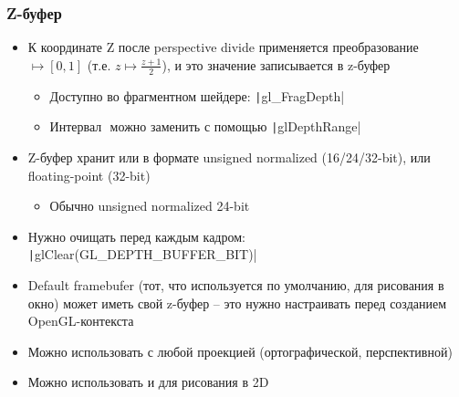 \documentclass[10pt]{beamer}
\begin{document}
\begin{frame}[fragile]
\frametitle{Z-буфер}
\begin{itemize}
\item К координате Z после perspective divide применяется преобразование \begin{math}[-1, 1] \mapsto [0, 1]\end{math} (т.е. \begin{math}z \mapsto \frac{z+1}{2}\end{math}), и это значение записывается в z-буфер
\pause
\begin{itemize}
\item Доступно во фрагментном шейдере: \texttt|gl_FragDepth|
\pause
\item Интервал \begin{math}[0, 1]\end{math} можно заменить с помощью \texttt|glDepthRange|
\end{itemize}
\pause
\item Z-буфер хранит или в формате unsigned normalized (16/24/32-bit), или floating-point (32-bit)
\begin{itemize}
\item Обычно unsigned normalized 24-bit
\end{itemize}
\pause
\item Нужно очищать перед каждым кадром: \texttt|glClear(GL_DEPTH_BUFFER_BIT)|
\pause
\item Default framebufer (тот, что используется по умолчанию, для рисования в окно) может иметь свой z-буфер -- это нужно настраивать перед созданием OpenGL-контекста
\pause
\item Можно использовать с любой проекцией (ортографической, перспективной)
\item Можно использовать и для рисования в 2D
\end{itemize}
\end{frame}
\end{document}
